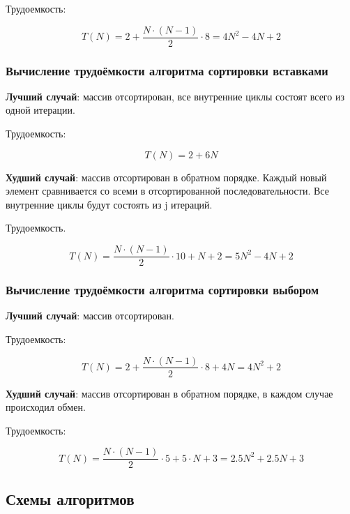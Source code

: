 \documentclass[14pt,russian]{scrartcl}
\begin{document}
Трудоемкость:

\begin{equation}
    T(N) = 2 + \frac{N \cdot (N - 1)}{2}\cdot 8 = 4N^2 - 4N + 2
\end{equation}

\subsubsection{Вычисление трудоёмкости алгоритма сортировки вставками}

\textbf{Лучший случай}: массив отсортирован, все внутренние циклы состоят всего из одной итерации.

Трудоемкость:

\begin{equation}
    T(N) = 2 + 6N
\end{equation}

\textbf{Худший случай}: массив отсортирован в обратном порядке. Каждый новый элемент сравнивается со всеми в отсортированной последовательности. Все внутренние циклы будут состоять из j итераций.

Трудоемкость.

\begin{equation}
    T(N) = \frac{N \cdot (N - 1)}{2} \cdot 10 + N + 2 = 5N^2 - 4N + 2
\end{equation}

\subsubsection{Вычисление трудоёмкости алгоритма сортировки выбором}

\textbf{Лучший случай}: массив отсортирован.

Трудоемкость:

\begin{equation}
    T(N) = 2 + \frac{N \cdot (N - 1)}{2} \cdot 8 + 4N = 4N^2 + 2
\end{equation}

\textbf{Худший случай}: массив отсортирован в обратном порядке, в каждом случае происходил обмен.

Трудоемкость:

\begin{equation}
    T(N) = \frac{N \cdot (N - 1)}{2} \cdot 5 + 5 \cdot N + 3 = 2.5N^2 + 2.5N + 3
\end{equation}

\subsection{Схемы алгоритмов}
\end{document}
